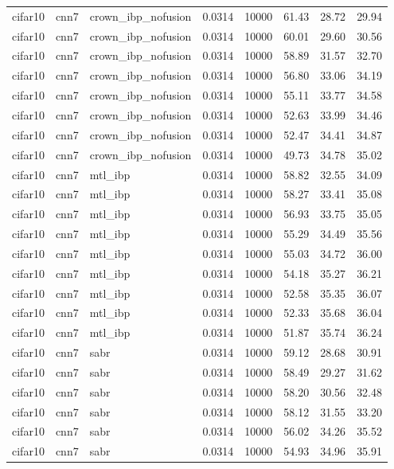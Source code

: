 \begin{tabular}{llllllll}
cifar10 & cnn7 & crown\_ibp\_nofusion & 0.0314 & 10000 & 61.43 & 28.72 & 29.94 \\
cifar10 & cnn7 & crown\_ibp\_nofusion & 0.0314 & 10000 & 60.01 & 29.60 & 30.56 \\
cifar10 & cnn7 & crown\_ibp\_nofusion & 0.0314 & 10000 & 58.89 & 31.57 & 32.70 \\
cifar10 & cnn7 & crown\_ibp\_nofusion & 0.0314 & 10000 & 56.80 & 33.06 & 34.19 \\
cifar10 & cnn7 & crown\_ibp\_nofusion & 0.0314 & 10000 & 55.11 & 33.77 & 34.58 \\
cifar10 & cnn7 & crown\_ibp\_nofusion & 0.0314 & 10000 & 52.63 & 33.99 & 34.46 \\
cifar10 & cnn7 & crown\_ibp\_nofusion & 0.0314 & 10000 & 52.47 & 34.41 & 34.87 \\
cifar10 & cnn7 & crown\_ibp\_nofusion & 0.0314 & 10000 & 49.73 & 34.78 & 35.02 \\
cifar10 & cnn7 & mtl\_ibp & 0.0314 & 10000 & 58.82 & 32.55 & 34.09 \\
cifar10 & cnn7 & mtl\_ibp & 0.0314 & 10000 & 58.27 & 33.41 & 35.08 \\
cifar10 & cnn7 & mtl\_ibp & 0.0314 & 10000 & 56.93 & 33.75 & 35.05 \\
cifar10 & cnn7 & mtl\_ibp & 0.0314 & 10000 & 55.29 & 34.49 & 35.56 \\
cifar10 & cnn7 & mtl\_ibp & 0.0314 & 10000 & 55.03 & 34.72 & 36.00 \\
cifar10 & cnn7 & mtl\_ibp & 0.0314 & 10000 & 54.18 & 35.27 & 36.21 \\
cifar10 & cnn7 & mtl\_ibp & 0.0314 & 10000 & 52.58 & 35.35 & 36.07 \\
cifar10 & cnn7 & mtl\_ibp & 0.0314 & 10000 & 52.33 & 35.68 & 36.04 \\
cifar10 & cnn7 & mtl\_ibp & 0.0314 & 10000 & 51.87 & 35.74 & 36.24 \\
cifar10 & cnn7 & sabr & 0.0314 & 10000 & 59.12 & 28.68 & 30.91 \\
cifar10 & cnn7 & sabr & 0.0314 & 10000 & 58.49 & 29.27 & 31.62 \\
cifar10 & cnn7 & sabr & 0.0314 & 10000 & 58.20 & 30.56 & 32.48 \\
cifar10 & cnn7 & sabr & 0.0314 & 10000 & 58.12 & 31.55 & 33.20 \\
cifar10 & cnn7 & sabr & 0.0314 & 10000 & 56.02 & 34.26 & 35.52 \\
cifar10 & cnn7 & sabr & 0.0314 & 10000 & 54.93 & 34.96 & 35.91 \\

\end{tabular}
